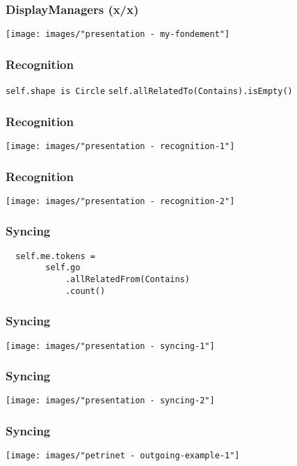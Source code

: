 \begin{frame}
  \frametitle{DisplayManagers (x/x)}
  \hspace{-1cm}
  \texttt{[image: images/"presentation - my-fondement"]}
\end{frame}


\begin{frame}[fragile]
  \frametitle{Recognition}
  \vspace{-1cm}
  \texttt{self.shape is Circle}
  \texttt{self.allRelatedTo(Contains).isEmpty()}
\end{frame}

\begin{frame}
  \frametitle{Recognition}
  \hspace{-1cm}
  \texttt{[image: images/"presentation - recognition-1"]}
\end{frame}

\begin{frame}
  \frametitle{Recognition}
  \hspace{-1cm}
  \texttt{[image: images/"presentation - recognition-2"]}
\end{frame}

\begin{frame}[fragile]
  \frametitle{Syncing}
  \vspace*{-2cm}
  \begin{lstlisting}
  self.me.tokens = 
        self.go
            .allRelatedFrom(Contains)
            .count()
  \end{lstlisting}
\end{frame}

\begin{frame}
  \frametitle{Syncing}
  \hspace{-1cm}
  \texttt{[image: images/"presentation - syncing-1"]}
\end{frame}

\begin{frame}
  \frametitle{Syncing}
  \hspace{-1cm}
  \texttt{[image: images/"presentation - syncing-2"]}
\end{frame}


\begin{frame}
  \frametitle{Syncing}

  \centering
  \hspace{-1cm}
  \texttt{[image: images/"petrinet - outgoing-example-1"]}

\end{frame}


